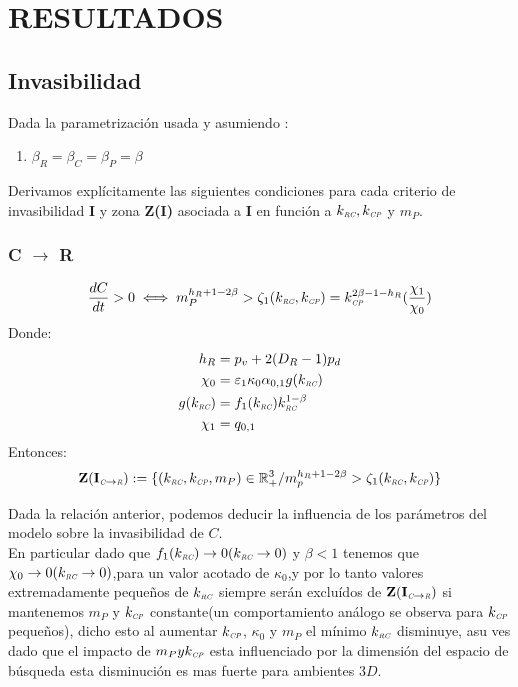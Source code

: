 \section{RESULTADOS}


\subsection{Invasibilidad}
Dada la parametrizaci\'on usada y asumiendo :
\begin{enumerate}
\item $\beta_R = \beta_C = \beta_P = \beta$
\end{enumerate}

Derivamos expl\'icitamente las siguientes condiciones para cada criterio de invasibilidad \textbf{I} y zona \textbf{Z(I)} asociada a \textbf{I} en funci\'on a $k_{\textit{\tiny RC}},k_{\textit{\tiny CP}}$ y $m_P$.

\subsubsection{C $\to$ R}

\begin{equation}
  \frac{dC}{dt} >0 \iff  m_P^{h_R +1 - 2\beta} > \zeta_1(k_{\textit{\tiny RC}},k_{\textit{\tiny CP}}) = k_{\textit{\tiny CP}}^{2\beta -1 -h_R}(\frac{\chi_1}{\chi_0})
\end{equation}
Donde:
\begin{equation}
  \begin{aligned}
    h_R &= p_v + 2(D_R - 1)p_d \\
    \chi_0 &= \varepsilon_1 \kappa_0\alpha_{0,1} g(k_{\textit{\tiny RC}}) \\
    g(k_{\textit{\tiny RC}}) &= f_1(k_{\textit{\tiny RC}})k_{\textit{\tiny RC}}^{1-\beta}\\
    \chi_1 &= q_{0,1} 
  \end{aligned}
\end{equation}
Entonces:
\begin{equation}
\mathbf{Z(I_{\textit{\tiny C}\to \textit{\tiny R}})} := \{ (k_{\textit{\tiny RC}},k_{\textit{\tiny CP}},m_P) \in \mathbb{R}^3_+ / m_p^{h_R + 1 - 2\beta} > \zeta_1(k_{\textit{\tiny RC}},k_{\textit{\tiny CP}}) \}
\end{equation}


Dada la relaci\'on anterior, podemos deducir la influencia de los par\'ametros del modelo sobre la invasibilidad de $C$.\\

En particular dado que $f_1(k_{\textit{\tiny RC}}) \to 0 (k_{\textit{\tiny RC}} \to 0)$ y $\beta <1$ tenemos que $\chi_0 \to 0 (k_{\textit{\tiny RC}} \to 0)$,para un valor acotado de $\kappa_0$,y por lo tanto valores extremadamente peque\~nos de $k_{\textit{\tiny RC}}$ siempre ser\'an exclu\'idos de $\mathbf{Z(I_{\textit{\tiny C}\to \textit{\tiny R}})}$ si mantenemos $m_P$ y $k_{\textit{\tiny CP}}$ constante(un comportamiento an\'alogo se observa para $k_{\textit{\tiny CP}}$ peque\~nos), dicho esto al aumentar $k_{\textit{\tiny CP}}$, $\kappa_0$ y $m_P$ el m\'inimo $k_{\textit{\tiny RC}}$ disminuye, asu ves dado que el impacto de $m_P y k_{\textit{\tiny CP}}$ esta influenciado por la dimensi\'on del espacio de b\'usqueda esta disminuci\'on es mas fuerte para ambientes $3D$.\\

